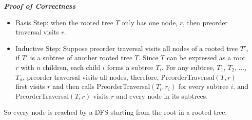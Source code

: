 \documentclass[11pt]{article}
\begin{document}
\begin{solution}
{{\item \textbf{\textit{Proof of Correctness}}
\begin{itemize}
\item Basis Step: when the rooted tree $T$ only has one node, $r$, then preorder traversal visits $r$.
\item Inductive Step: Suppose preorder traversal visits all nodes of a rooted tree $T'$, if $T'$ is a subtree of another rooted tree $T$. Since $T$ can be expressed as a root $r$ with $n$ children, each child $i$ forms a subtree $T_{i}$. For any subtree, $T_{1}$, $T_{2}$, ..., $T_{n}$, preorder traversal visits all nodes, therefore, PreorderTraversal$(T, r)$ first visits $r$ and then calls PreorderTraversal$(T_{i}, r_{i})$ for every subtree $i$, and PreorderTraversal$(T, r)$ visits $r$ and every node in its subtrees.
\end{itemize}
So every node is reached by a DFS starting from the root in a rooted tree.
  }
}
\end{solution}
\end{document}
